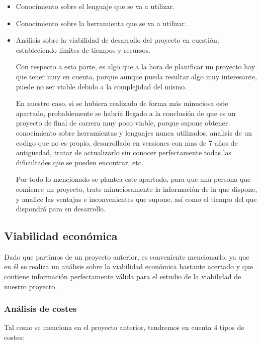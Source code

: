 \begin{itemize}

\item Conocimiento sobre el lenguaje que se va a utilizar.
\item Conocimiento sobre la herramienta que se va a utilizar.
\item Análisis sobre la viabilidad de desarrollo del proyecto en cuestión, estableciendo límites de tiempos y recursos.
	
	Con respecto a esta parte, es algo que a la hora de planificar un proyecto hay que tener muy en cuenta, porque aunque pueda resultar algo muy interesante, puede no ser viable debido a la complejidad del mismo.
	
	En nuestro caso, si se hubiera realizado de forma más minuciosa este apartado, probablemente se habría llegado a la conclusión de que es un proyecto de final de carrera muy poco viable, porque supone obtener conocimiento sobre herramientas y lenguajes nunca utilizados, analisis de un codigo que no es propio, desarrollado en versiones con mas de 7 años de antigüedad, tratar de actualizarlo sin conocer perfectamente todas las dificultades que se pueden encontrar, etc.
	
	Por todo lo mencionado se plantea este apartado, para que una persona que comience un proyecto, trate minuciosamente la información de la que dispone, y analice las ventajas e inconvenientes que supone, así como el tiempo del que dispondrá para su desarrollo.

\end{itemize}



\subsection{Viabilidad económica}

Dado que partimos de un proyecto anterior, es conveniente mencionarlo, ya que en él se realiza un análisis sobre la viabilidad económica bastante acertado y que contiene información perfectamente válida para el estudio de la viabilidad de nuestro proyecto.

\subsubsection{Análisis de costes}

Tal como se menciona en el proyecto anterior, tendremos en cuenta 4 tipos de costes:

